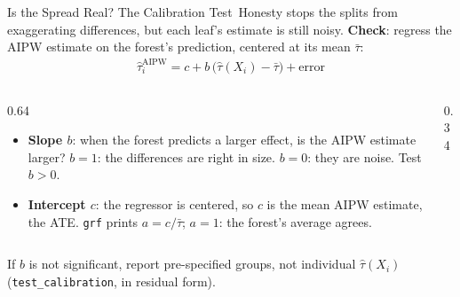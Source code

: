 \documentclass[aspectratio=169,11pt,xcolor=dvipsnames]{beamer}
\newcommand{\srcp}[1]{{\scriptsize\color{gray}(#1)}}
\newcommand{\core}{\,\raisebox{0.6pt}{\textcolor{corestar}{$\bigstar$}}}
\begin{document}
\begin{frame}{Is the Spread Real? The Calibration Test\core}
Honesty stops the splits from exaggerating differences, but each leaf's estimate is still noisy.
\vskip2pt
\textbf{Check}: regress the AIPW estimate on the forest's prediction, centered at its mean $\bar\tau$:
\begin{align*}
  \hat\tau_i^{\text{AIPW}} = c + b\,\big(\hat\tau(X_i) - \bar\tau\big) + \text{error}
\end{align*}
\vskip-8pt
\begin{columns}[c]
\begin{column}{0.64\linewidth}
\small
\begin{itemize}\itemsep3pt
  \item \textbf{Slope $b$}: when the forest predicts a larger effect, is the AIPW estimate larger?
        $b = 1$: the differences are right in size. $b = 0$: they are noise. Test $b > 0$.
  \item \textbf{Intercept $c$}: the regressor is centered, so $c$ is the mean AIPW estimate, the ATE.
        \texttt{grf} prints $a = c/\bar\tau$; $a = 1$: the forest's average agrees.
\end{itemize}
\end{column}
\begin{column}{0.34\linewidth}
\begin{center}
\end{center}
\end{column}
\end{columns}
\vskip3pt
{\small If $b$ is not significant, report pre-specified groups, not individual $\hat\tau(X_i)$
\srcp{\texttt{test\_calibration}, in residual form}.}
\end{frame}
\end{document}
